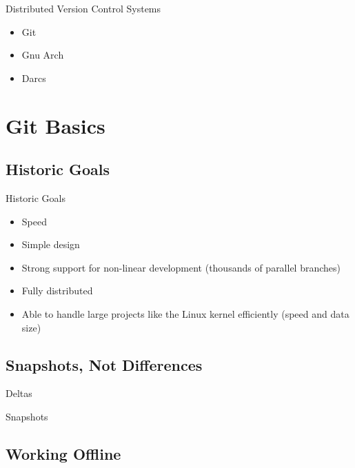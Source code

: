 \documentclass{beamer}
\begin{document}
\begin{frame}{Distributed Version Control Systems}
  \begin{itemize}
  \item
    Git
  \item
    Gnu Arch
  \item
    Darcs
  \end{itemize}
\end{frame}

\section{Git Basics}

\subsection{Historic Goals}

\begin{frame}{Historic Goals}
  \begin{itemize}
  \item
    Speed
  \item
    Simple design
  \item
    Strong support for non-linear development (thousands of parallel branches)
  \item
    Fully distributed
  \item
    Able to handle large projects like the Linux kernel efficiently (speed and data size)
  \end{itemize}
\end{frame}

\subsection{Snapshots, Not Differences}

\begin{frame}{Deltas}
    \centering
    \hfill\vfill
\end{frame}

\begin{frame}{Snapshots}
    \centering
    \hfill\vfill
\end{frame}

\subsection{Working Offline}
\end{document}
